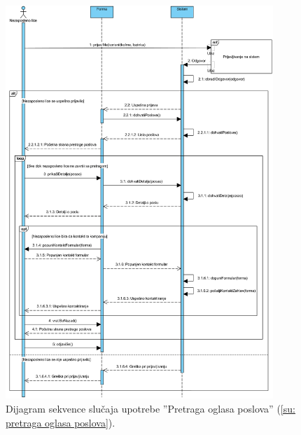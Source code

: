 \begin{figure}[H]
	\centering
	\includegraphics[width=0.9\textwidth]{dijagrami/dijagrami-sekvence/pretraga-oglasa-poslova.png}
	\caption{Dijagram sekvence slu\v caja upotrebe ''Pretraga oglasa poslova'' (\ref{su: pretraga oglasa poslova}).}
\end{figure}


